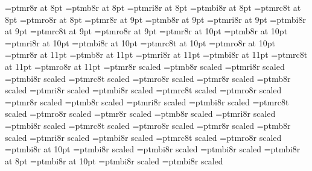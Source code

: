 %
\immediate{}
%
\font\eightrm=ptmr8r at 8pt
\font\eightbf=ptmb8r at 8pt
\font\eightit=ptmri8r at 8pt
\font\eightbi=ptmbi8r at 8pt
\font\eightsc=ptmrc8t at 8pt  %
\font\eightsl=ptmro8r at 8pt
%
\font\ninerm=ptmr8r at 9pt
\font\ninebf=ptmb8r at 9pt
\font\nineit=ptmri8r at 9pt
\font\ninebi=ptmbi8r at 9pt
\font\ninesc=ptmrc8t at 9pt
\font\ninesl=ptmro8r at 9pt
%
\font\tenrm=ptmr8r at 10pt
\font\tenbf=ptmb8r at 10pt
\font\tenit=ptmri8r at 10pt
\font\tenbi=ptmbi8r at 10pt
\font\tensc=ptmrc8t at 10pt
\font\tensl=ptmro8r at 10pt
%
%
\font\elevenrm=ptmr8r at 11pt
\font\elevenbf=ptmb8r at 11pt
\font\elevenit=ptmri8r at 11pt
\font\elevenbi=ptmbi8r at 11pt
\font\elevensc=ptmrc8t at 11pt
\font\elevensl=ptmro8r at 11pt
%
\font\twelverm=ptmr8r scaled 
\font\twelvebf=ptmb8r scaled 
\font\twelveit=ptmri8r scaled 
\font\twelvebi=ptmbi8r scaled 
\font\twelvesc=ptmrc8t scaled 
\font\twelvesl=ptmro8r scaled 
%
\font\frtrm=ptmr8r scaled 
\font\frtbf=ptmb8r scaled 
\font\frtit=ptmri8r scaled 
\font\frtbi=ptmbi8r scaled 
\font\frtsc=ptmrc8t scaled 
\font\frtsl=ptmro8r scaled 
%
\font\svtrm=ptmr8r scaled 
\font\svtbf=ptmb8r scaled 
\font\svtit=ptmri8r scaled 
\font\svtbi=ptmbi8r scaled 
\font\svtsc=ptmrc8t scaled 
\font\svtsl=ptmro8r scaled 
%
\font\twtyrm=ptmr8r scaled 
\font\twtybf=ptmb8r scaled 
\font\twtyit=ptmri8r scaled 
\font\twtybi=ptmbi8r scaled 
\font\twtysc=ptmrc8t scaled 
\font\twtysl=ptmro8r scaled 
%
\font\twfvrm=ptmr8r scaled 
\font\twfvbf=ptmb8r scaled 
\font\twfvit=ptmri8r scaled 
\font\twfvbi=ptmbi8r scaled 
\font\twfvsc=ptmrc8t scaled 
\font\twfvsl=ptmro8r scaled 
%
\let\bigfont=\frtrm
\let\Bigfont=\svtrm
\let\BIgfont=\twtyrm
\let\BIGfont=\twfvrm
%
%
\font\ppffsixteen=ptmbi8r at 10pt
\font\ppfftwenty=ptmbi8r scaled 
\font\ppfftwentyfour=ptmbi8r scaled 
\font\ppfftwentynine=ptmbi8r scaled 
\font\tinyppff=ptmbi8r at 8pt
\font\smallppff=ptmbi8r at 10pt
\font\normppff=ptmbi8r scaled 
\font\medppff=ptmbi8r scaled 
%
\def\f{{\ppff f}}
\def\ff{{\ppff ff}}
\def\fp{{\ppff fp}}
\def\fff{{\ppff fff}}
\def\ffff{{\ppff ffff}}
\def\mf{{\ppff mf}}
\def\p{{\ppff p}}
\def\pp{{\ppff pp}}
\def\ppp{{\ppff ppp}}
\def\pppp{{\ppff pppp}}

